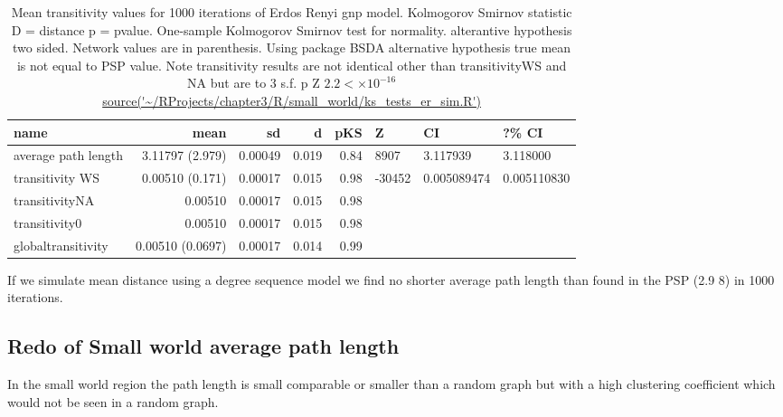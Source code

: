 \begin{table}[ht]
\centering
\begin{tabular}{lrrrrlll}
  \hline
name & mean & sd & d & pKS & Z &CI & ?\% CI  \\ 
  \hline
average path length & 3.11797 (2.979) & 0.00049 & 0.019 & 0.84 & 8907 &  3.117939& 3.118000 \\ 
  transitivity WS & 0.00510 (0.171) & 0.00017 & 0.015 & 0.98 &  -30452 & 0.005089474 &0.005110830 \\ 
  transitivityNA & 0.00510 & 0.00017 & 0.015 & 0.98 \\ 
  transitivity0 & 0.00510 & 0.00017 & 0.015 & 0.98 \\ 
  globaltransitivity & 0.00510 (0.0697) & 0.00017 & 0.014 & 0.99 \\ 
   \hline
\end{tabular}
\caption{Mean transitivity values for 1000 iterations of Erdos Renyi gnp model. Kolmogorov Smirnov statistic D = distance p = pvalue. One-sample Kolmogorov Smirnov test for normality. alterantive hypothesis two sided. Network values are in parenthesis. Using package BSDA alternative hypothesis true mean is not equal to PSP value. Note transitivity results are not identical other than transitivityWS and NA but are to 3 s.f. p Z $2.2<\times10^{-16}$ \url{source('~/RProjects/chapter3/R/small_world/ks_tests_er_sim.R')} } 
\label{tab:Mean transitivity values for 1000 iterations of Erdos Renyi gnp model.}
\end{table}

If we simulate mean distance using a degree sequence model we find no shorter average path length than found in the PSP (2.9 8) in 1000 iterations.


\subsection{Redo of Small world average path length}

In the small world region the path length is small comparable  or smaller than a random graph but with a high clustering coefficient which would not be seen in a random graph. 





